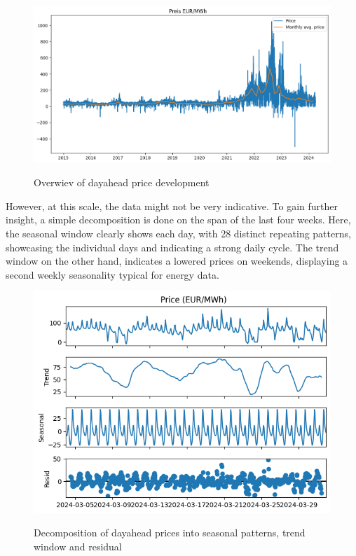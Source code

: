 \documentclass[a4paper]{article}
\begin{document}
\begin{figure}
\centering
{\includegraphics[keepaspectratio]{src/image.png}}
\caption{Overwiev of dayahead price development}
\end{figure}

However, at this scale, the data might not be very indicative. To gain
further insight, a simple decomposition is done on the span of the last
four weeks. Here, the seasonal window clearly shows each day, with 28
distinct repeating patterns, showcasing the individual days and
indicating a strong daily cycle. The trend window on the other hand,
indicates a lowered prices on weekends, displaying a second weekly
seasonality typical for energy data.

\begin{figure}
\centering
{\includegraphics[keepaspectratio]{src/image-2.png}}
\caption{Decomposition of dayahead prices into seasonal patterns, trend
window and residual}
\end{figure}
\end{document}
